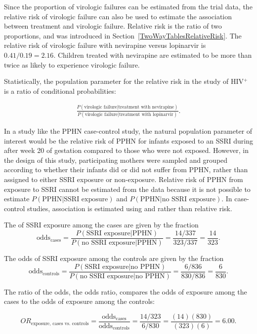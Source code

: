 Since the proportion of virologic failures can be estimated from the trial data, the relative risk of virologic failure can also be used to estimate the association between treatment and virologic failure. Relative risk is the ratio of two proportions, and was introduced in Section~\ref{TwoWayTablesRelativeRisk}.  The relative risk of virologic failure with nevirapine versus lopinarvir is $0.41/0.19 = 2.16$.  Children treated with nevirapine are estimated to be more than twice as likely to experience virologic failure.

Statistically, the population parameter for the relative risk in the study of HIV$^+$ is a ratio of conditional probabilities:

\begin{align*}
  \frac{P(\text{virologic failure}| \text{treatment with nevirapine})}
  {P(\text{virologic failure}|\text{treatment with lopinarvir})}.
\end{align*}

In a study like the PPHN case-control study, the natural population parameter of interest would be the relative risk of PPHN for infants exposed to an SSRI during after week 20 of gestation compared to those who were not exposed. However, in the design of this study, participating mothers were sampled and grouped according to whether their infants did or did not suffer from PPHN, rather than assigned to either SSRI exposure or non-exposure. Relative risk of PPHN from exposure to SSRI cannot be estimated from the data because it is not possible to estimate $P(\text{PPHN} | \text{SSRI exposure})$ and $P(\text{PPHN} | \text{no SSRI exposure})$. In case-control studies, association is estimated using  and  rather than relative risk.

The  of SSRI exposure among the cases are given by the fraction
\[
  \text{odds$_\text{cases}$} = \frac{P(\text{SSRI exposure} | \text{PPHN})}
  {P(\text{no SSRI exposure} | \text{PPHN})} = \frac{14/337}{323/337} = \frac{14}{323}.
\]

The odds of SSRI exposure among the controls are given by the fraction
\[
  \text{odds$_\text{controls}$} = \frac{P(\text{SSRI exposure} | \text{no PPHN})}
  {P(\text{no SSRI exposure} | \text{no PPHN})} = \frac{6/836}{830/836} = \frac{6}{830}.
\]

The ratio of the odds, the odds ratio, compares the odds of exposure among the cases to the odds of exposure among the controls:

\[OR_{\text{exposure, cases vs. controls}} = \frac{\text{odds$_\text{cases}$}}{\text{odds$_\text{controls}$}} = \frac{14/323}{6/830} = \frac{(14)(830)}{(323)(6)} =  6.00. \]

